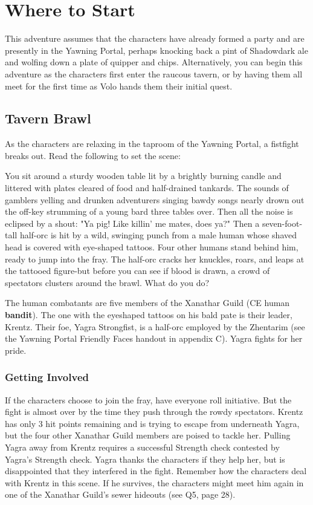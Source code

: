 \documentclass[10pt,a4paper,twoside,twocolumn,openany,nodeprecatedcode]{dndbook}
\begin{document}
\section{Where to Start}
This adventure assumes that the characters have already formed a party and are presently in the Yawning Portal, perhaps knocking back a pint of Shadowdark ale and wolfing down a plate of quipper and chips. Alternatively, you can begin this adventure as the characters first enter the raucous tavern, or by having them all meet for the first time as Volo hands them their initial quest.
\subsection{Tavern Brawl}
As the characters are relaxing in the taproom of the Yawning Portal, a fistfight breaks out. Read the following to set the scene:
\begin{DndReadAloud}{}
You sit around a sturdy wooden table lit by a brightly burning candle and littered with plates cleared of food and half-drained tankards. The sounds of gamblers yelling and drunken adventurers singing bawdy songs nearly drown out the off-key strumming of a young bard three tables over.
Then all the noise is eclipsed by a shout: "Ya pig! Like killin' me mates, does ya?" Then a seven-foot-tall half-orc is hit by a wild, swinging punch from a male human whose shaved head is covered with eye-shaped tattoos. Four other humans stand behind him, ready to jump into the fray. The half-orc cracks her knuckles, roars, and leaps at the tattooed figure-but before you can see if blood is drawn, a crowd of spectators clusters around the brawl. What do you do?
\end{DndReadAloud}

The human combatants are five members of the Xanathar Guild (CE human \textbf{bandit}). The one with the eyeshaped tattoos on his bald pate is their leader, Krentz. Their foe, Yagra Strongfist, is a half-orc employed by the Zhentarim (see the Yawning Portal Friendly Faces handout in appendix C). Yagra fights for her pride.
\subsubsection{Getting Involved}
If the characters choose to join the fray, have everyone roll initiative. But the fight is almost over by the time they push through the rowdy spectators. Krentz has only 3 hit points remaining and is trying to escape from underneath Yagra, but the four other Xanathar Guild members are poised to tackle her.
Pulling Yagra away from Krentz requires a successful Strength check contested by Yagra's Strength check. Yagra thanks the characters if they help her, but is disappointed that they interfered in the fight.
Remember how the characters deal with Krentz in this scene. If he survives, the characters might meet him again in one of the Xanathar Guild's sewer hideouts (see Q5, page 28).
\end{document}
